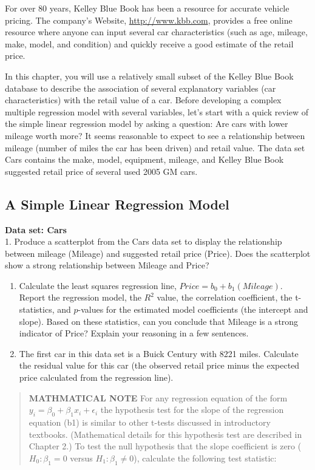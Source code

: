 \documentclass[
]{report}
\begin{document}
For over 80 years, Kelley Blue Book has been a resource for accurate vehicle pricing. The company's Website, \url{http://www.kbb.com}, provides a free online resource where anyone can input several car characteristics (such as age, mileage, make, model, and condition) and quickly receive a good estimate of the retail price.

In this chapter, you will use a relatively small subset of the Kelley Blue Book database to describe the association of several explanatory variables (car characteristics) with the retail value of a car. Before developing a complex multiple regression model with several variables, let's start with a quick review of the simple linear regression model by asking a question: Are cars with lower mileage worth more? It seems reasonable
to expect to see a relationship between mileage (number of miles the car has been driven) and retail value. The data set Cars contains the make, model, equipment, mileage, and Kelley Blue Book suggested retail price of several used 2005 GM cars.

\subsection{A Simple Linear Regression Model}\label{a-simple-linear-regression-model}

\textbf{Data set: Cars}\\
1. Produce a scatterplot from the Cars data set to display the relationship between mileage (Mileage) and suggested retail price (Price). Does the scatterplot show a strong relationship between Mileage and Price?

\begin{enumerate}
\def\labelenumi{\arabic{enumi}.}
\setcounter{enumi}{1}
\item
  Calculate the least squares regression line, \(Price = b_0 + b_1(Mileage)\). Report the regression model, the \(R^2\) value, the correlation coefficient, the t-statistics, and \(p\)-values for the estimated model coefficients (the intercept and slope). Based on these statistics, can you conclude that Mileage is a strong indicator of Price? Explain your reasoning in a few sentences.
\item
  The first car in this data set is a Buick Century with 8221 miles. Calculate the residual value for this car (the observed retail price minus the expected price calculated from the regression line).
\end{enumerate}

\begin{quote}
\textbf{MATHMATICAL NOTE} For any regression equation of the form \(y_i = \beta_0 + \beta_1x_i + \epsilon_i\) the hypothesis test for the slope of the regression equation (b1) is similar to other t-tests discussed in introductory textbooks. (Mathematical details for this hypothesis test are described in Chapter 2.) To test the null hypothesis that the slope coefficient is zero (\(H_0 : \beta_1 = 0\) versus \(H_1 : \beta_1 \ne 0\)), calculate the following test statistic:
\end{quote}
\end{document}
